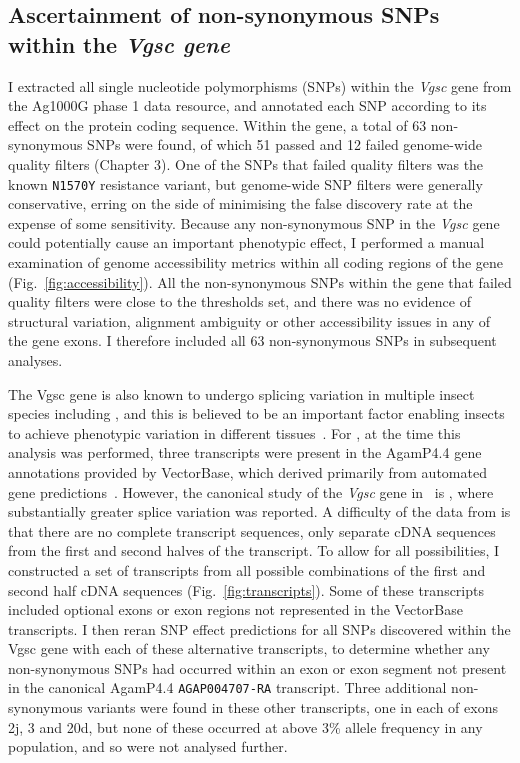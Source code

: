 \documentclass[a4paper,11pt,abstracton,hidelinks]{scrartcl}
\begin{document}
\subsection{Ascertainment of non-synonymous SNPs within the \textit{Vgsc gene}}\label{subsec:methods-asc}


I extracted all single nucleotide polymorphisms (SNPs) within the \textit{Vgsc} gene from the Ag1000G phase 1 data resource, and annotated each SNP according to its effect on the protein coding sequence.
%
Within the gene, a total of 63 non-synonymous SNPs were found, of which 51 passed and 12 failed genome-wide quality filters (Chapter 3).
%
One of the SNPs that failed quality filters was the known \texttt{N1570Y} resistance variant, but genome-wide SNP filters were generally conservative, erring on the side of minimising the false discovery rate at the expense of some sensitivity.
%
Because any non-synonymous SNP in the \textit{Vgsc} gene could potentially cause an important phenotypic effect, I performed a manual examination of genome accessibility metrics within all coding regions of the gene (Fig.~\ref{fig:accessibility}).
%
All the non-synonymous SNPs within the gene that failed quality filters were close to the thresholds set, and there was no evidence of structural variation, alignment ambiguity or other accessibility issues in any of the gene exons.
%
I therefore included all 63 non-synonymous SNPs in subsequent analyses.


The Vgsc gene is also known to undergo splicing variation in multiple insect species including \agam, and this is believed to be an important factor enabling insects to achieve phenotypic variation in different tissues~\parencite{Dong2014,Davies2007}.
%
For \agam, at the time this analysis was performed, three transcripts were present in the AgamP4.4 gene annotations provided by VectorBase, which derived primarily from automated gene predictions~\parencite{Curwen2004}.
%
However, the canonical study of the \textit{Vgsc} gene in \agam\ is \textcite{Davies2007}, where substantially greater splice variation was reported.
%
A difficulty of the data from \textcite{Davies2007} is that there are no complete transcript sequences, only separate cDNA sequences from the first and second halves of the transcript.
%
To allow for all possibilities, I constructed a set of transcripts from all possible combinations of the first and second half cDNA sequences (Fig.~\ref{fig:transcripts}).
%
Some of these transcripts included optional exons or exon regions not represented in the VectorBase transcripts.
%
I then reran SNP effect predictions for all SNPs discovered within the Vgsc gene with each of these alternative transcripts, to determine whether any non-synonymous SNPs had occurred within an exon or exon segment not present in the canonical AgamP4.4 \texttt{AGAP004707-RA} transcript.
%
Three additional non-synonymous variants were found in these other transcripts, one in each of exons 2j, 3 and 20d, but none of these occurred at above 3\% allele frequency in any population, and so were not analysed further.
\end{document}
